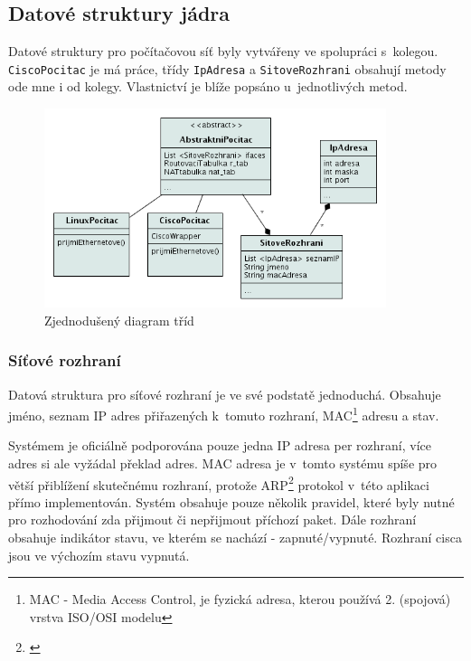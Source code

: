 \subsection{Datové struktury jádra}
Datové struktury pro počítačovou síť byly vytvářeny ve spolupráci s~kolegou. \verb|CiscoPocitac| je má práce, třídy \verb|IpAdresa| a \verb|SitoveRozhrani| obsahují metody ode mne i od kolegy. Vlastnictví je blíže popsáno u~jednotlivých metod.

\begin{figure}[h]
\begin{center}
\includegraphics[width=10cm]{figures/uml_class}
\caption{Zjednodušený diagram tříd}
\label{uml:class}
\end{center}
\end{figure}


\subsubsection{Síťové rozhraní}
Datová struktura pro síťové rozhraní je ve své podstatě jednoduchá. Obsahuje jméno, seznam IP adres přiřazených k~tomuto rozhraní, MAC\footnote{MAC - Media Access Control, je fyzická adresa, kterou používá 2. (spojová) vrstva ISO/OSI modelu} adresu a stav.

Systémem je oficiálně podporována pouze jedna IP adresa per rozhraní, více adres si ale vyžádal překlad adres. MAC adresa je v~tomto systému spíše pro větší přiblížení skutečnému rozhraní, protože ARP\footnote{\cite{wiki:arp}} protokol v~této aplikaci přímo implementován. Systém obsahuje pouze několik pravidel, které byly nutné pro rozhodování zda přijmout či nepřijmout příchozí paket. Dále rozhraní obsahuje indikátor stavu, ve kterém se nachází - zapnuté/vypnuté. Rozhraní cisca jsou ve výchozím stavu vypnutá.

